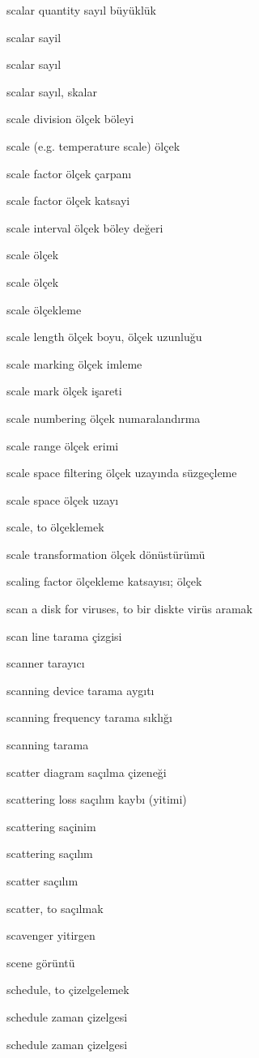 \documentclass[12pt,fleqn]{article}\usepackage{../../common}
\begin{document}
scalar quantity sayıl büyüklük

scalar sayil

scalar sayıl

scalar sayıl, skalar

scale division ölçek böleyi

scale (e.g. temperature scale) ölçek

scale factor ölçek çarpanı

scale factor ölçek katsayi

scale interval ölçek böley değeri

scale ölçek

scale ölçek

scale ölçekleme

scale length ölçek boyu, ölçek uzunluğu

scale marking ölçek imleme

scale mark ölçek işareti

scale numbering ölçek numaralandırma

scale range ölçek erimi

scale space filtering ölçek uzayında süzgeçleme

scale space ölçek uzayı

scale, to ölçeklemek

scale transformation ölçek dönüstürümü

scaling factor ölçekleme katsayısı; ölçek

scan a disk for viruses, to bir diskte virüs aramak

scan line tarama çizgisi

scanner tarayıcı

scanning device tarama aygıtı

scanning frequency tarama sıklığı

scanning tarama

scatter diagram saçılma çizeneği

scattering loss saçılım kaybı (yitimi)

scattering saçinim

scattering saçılım

scatter saçılım

scatter, to saçılmak

scavenger yitirgen

scene görüntü

schedule, to çizelgelemek

schedule zaman çizelgesi

schedule zaman çizelgesi
\end{document}
